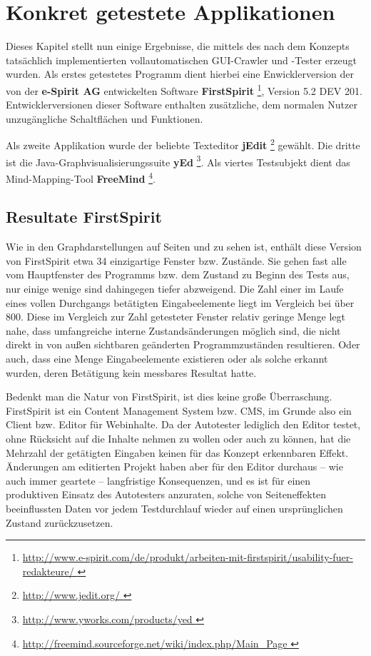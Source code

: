 \chapter{Konkret getestete Applikationen}\label{chapter:concretetests}


Dieses Kapitel stellt nun einige Ergebnisse, die mittels des nach dem Konzepts tatsächlich
implementierten vollautomatischen GUI-Crawler und -Tester erzeugt wurden.
Als erstes getestetes Programm dient hierbei eine Enwicklerversion der von der
\textbf{e-Spirit AG} entwickelten Software \textbf{FirstSpirit} 
\footnote{\url{ http://www.e-spirit.com/de/produkt/arbeiten-mit-firstspirit/usability-fuer-redakteure/ }},
Version 5.2 DEV 201. Entwicklerversionen dieser Software enthalten zusätzliche,
dem normalen Nutzer unzugängliche Schaltflächen und Funktionen.

Als zweite Applikation wurde der beliebte Texteditor \textbf{jEdit}
\footnote{\url{ http://www.jedit.org/ }} gewählt. Die dritte ist
die Java-Graphvisualisierungssuite \textbf{yEd}
\footnote{\url{ http://www.yworks.com/products/yed }}.
Als viertes Testsubjekt dient das \glqq{}Mind-Mapping\grqq{}-Tool \textbf{FreeMind}
\footnote{\url{ http://freemind.sourceforge.net/wiki/index.php/Main_Page }}.



\section{Resultate FirstSpirit}\label{section:testresults}

Wie in den Graphdarstellungen auf Seiten \pageref{fig:model_firstspirit_notext} und 
\pageref{fig:model_freespirit_06.10.2015} zu sehen ist, enthält diese Version von
FirstSpirit etwa 34 einzigartige Fenster bzw. Zustände. Sie gehen fast alle vom
Hauptfenster des Programms bzw. dem Zustand zu Beginn des Tests aus,
nur einige wenige sind dahingegen tiefer abzweigend. Die Zahl einer im
Laufe eines vollen Durchgangs betätigten Eingabeelemente liegt im Vergleich bei
über 800. Diese im Vergleich zur Zahl getesteter Fenster relativ geringe 
Menge legt nahe, dass umfangreiche interne Zustandsänderungen
möglich sind, die nicht direkt in von außen sichtbaren geänderten
Programmzuständen resultieren. Oder auch, dass eine Menge Eingabeelemente
existieren oder als solche erkannt wurden, deren Betätigung kein messbares
Resultat hatte.

Bedenkt man die Natur von FirstSpirit, ist dies keine große Überraschung.
FirstSpirit ist ein Content Management System bzw. CMS, im Grunde also
ein Client bzw. Editor für Webinhalte. Da der Autotester lediglich den Editor testet,
ohne Rücksicht auf die Inhalte nehmen zu wollen oder auch zu können,
hat die Mehrzahl der getätigten Eingaben keinen für das Konzept erkennbaren
Effekt. Änderungen am editierten Projekt haben aber für den Editor durchaus
-- wie auch immer geartete -- langfristige Konsequenzen, und es ist für
einen produktiven Einsatz des Autotesters anzuraten, solche von Seiteneffekten
beeinflussten Daten vor jedem Testdurchlauf wieder auf einen ursprünglichen
Zustand zurückzusetzen.

